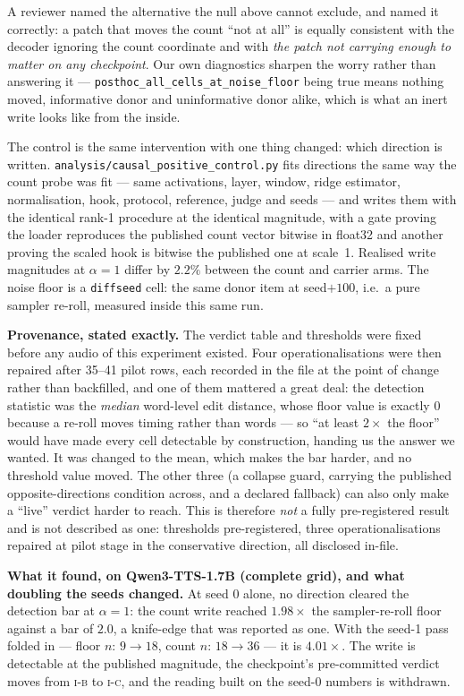 \documentclass[11pt]{article}
\begin{document}
A reviewer named the alternative the null above cannot exclude, and named it
correctly: a patch that moves the count ``not at all'' is equally consistent
with the decoder ignoring the count coordinate and with \emph{the patch not
carrying enough to matter on any checkpoint}. Our own diagnostics sharpen the
worry rather than answering it --- \texttt{posthoc\_all\_cells\_at\_noise\_floor}
being true means nothing moved, informative donor and uninformative donor alike,
which is what an inert write looks like from the inside.

The control is the same intervention with one thing changed: which direction is
written. \texttt{analysis/causal\_positive\_control.py} fits directions the same
way the count probe was fit --- same activations, layer, window, ridge
estimator, normalisation, hook, protocol, reference, judge and seeds --- and
writes them with the identical rank-1 procedure at the identical magnitude, with
a gate proving the loader reproduces the published count vector bitwise in
float32 and another proving the scaled hook is bitwise the published one at
scale~1. Realised write magnitudes at $\alpha{=}1$ differ by $2.2\%$ between the
count and carrier arms. The noise floor is a \texttt{diffseed} cell: the same
donor item at seed${+}100$, i.e.\ a pure sampler re-roll, measured inside this
same run.

\textbf{Provenance, stated exactly.} The verdict table and thresholds were fixed
before any audio of this experiment existed. Four operationalisations were then
repaired after 35--41 pilot rows, each recorded in the file at the point of
change rather than backfilled, and one of them mattered a great deal: the
detection statistic was the \emph{median} word-level edit distance, whose floor
value is exactly $0$ because a re-roll moves timing rather than words --- so
``at least $2\times$ the floor'' would have made every cell detectable by
construction, handing us the answer we wanted. It was changed to the mean, which
makes the bar harder, and no threshold value moved. The other three (a collapse
guard, carrying the published opposite-directions condition across, and a
declared fallback) can also only make a ``live'' verdict harder to reach. This
is therefore \emph{not} a fully pre-registered result and is not described as
one: thresholds pre-registered, three operationalisations repaired at pilot stage
in the conservative direction, all disclosed in-file.

\textbf{What it found, on Qwen3-TTS-1.7B (complete grid), and what doubling the
seeds changed.} At seed 0 alone, no direction cleared the detection bar at
$\alpha{=}1$: the count write reached $1.98\times$ the sampler-re-roll floor
against a bar of $2.0$, a knife-edge that was reported as one. With the seed-1
pass folded in --- floor $n{:}\,9\to18$, count $n{:}\,18\to36$ --- it is
$4.01\times$. The write is detectable at the published magnitude, the
checkpoint's pre-committed verdict moves from \textsc{i-b} to \textsc{i-c}, and
the reading built on the seed-0 numbers is withdrawn.
\end{document}
